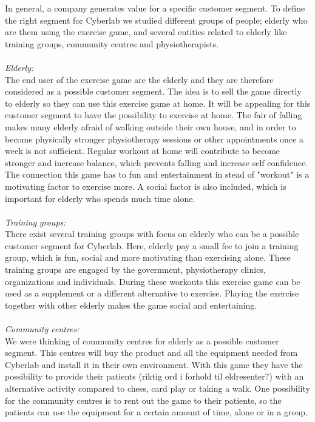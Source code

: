 In general, a company generates value for a specific customer segment. To define the right segment for Cyberlab we studied different groups of people; elderly who are them using the exercise game, and several entities related to elderly like training groups, community centres and physiotherapists.\\ \\ 
\emph{Elderly:}\\ 
The end user of the exercise game are the elderly and they are therefore considered as a possible customer segment. The idea is to sell the game directly to elderly so they can use this exercise game at home. It will be  appealing for this customer segment to have the possibility to exercise at home. The fair of falling makes many elderly afraid of walking outside their own house, and in order to become physically stronger physiotherapy sessions or other appointments once a week is not sufficient. Regular workout at home will contribute to become stronger and increase balance, which prevents falling and increase self confidence. The connection this game has to fun and entertainment in stead of "workout" is a motivating factor to exercise more. A social factor is also included, which is important for elderly who spends much time alone. \\ \\
\emph{Training groups:}\\ 
There exist several training groups with focus on elderly who can be a possible customer segment for Cyberlab. Here, elderly pay a small fee to join a training group, which is fun, social and more motivating than exercising alone. These training groups are engaged by the government, physiotherapy clinics, organizations and individuals. During these workouts this exercise game can be used as a supplement or a different alternative to exercise. Playing the exercise together with other elderly makes the game social and entertaining. \\ \\
\emph{Community centres:} \\
We were thinking of community centres for elderly as a possible customer segment. This centres will buy the product and all the equipment needed from Cyberlab and install it in their own environment. With this game they have the possibility to provide their patients (riktig ord i forhold til eldresenter?) with an alternative activity compared to chess, card play or taking a walk. One possibility for the community centres is to rent out the game to their patients, so the patients can use the equipment for a certain amount of time, alone or in a group. \\ \\
